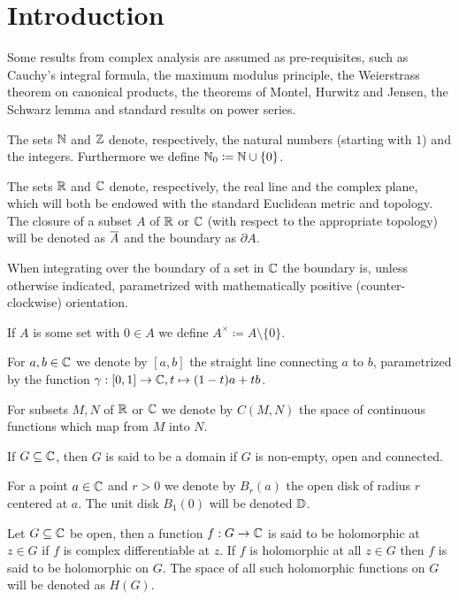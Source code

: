 \chapter{Introduction}
\label{ch:introduction}




Some results from complex analysis are assumed as pre-requisites, such as Cauchy's integral formula, the maximum modulus principle, the Weierstrass theorem on canonical products, the theorems of Montel, Hurwitz and Jensen, the Schwarz lemma and standard results on power series.

The sets $\mathbb{N}$ and $\mathbb{Z}$ denote, respectively, the natural numbers (starting with $1$) and the integers. Furthermore we define $\mathbb{N}_0 \coloneqq \mathbb{N} \cup \{ 0 \}$.

The sets $\mathbb{R}$ and $\mathbb{C}$ denote, respectively, the real line and the complex plane, which will both be endowed with the standard Euclidean metric and topology. The closure of a subset $A$ of $\mathbb{R}$ or $\mathbb{C}$ (with respect to the appropriate topology) will be denoted as $\overline{A}$ and the boundary as $\partial A$.

When integrating over the boundary of a set in $\mathbb{C}$ the boundary is, unless otherwise indicated, parametrized with mathematically positive (counter-clockwise) orientation.

If $A$ is some set with $0 \in A$ we define $A^\times \coloneqq A \setminus \{ 0 \}$.

For $a, b \in \mathbb{C}$ we denote by $[a, b]$ the straight line connecting $a$ to $b$, parametrized by the function $\gamma : [0, 1] \to \mathbb{C}, t \mapsto (1-t)a + tb$.

For subsets $M, N$ of $\mathbb{R}$ or $\mathbb{C}$ we denote by $C(M, N)$ the space of continuous functions which map from $M$ into $N$.

If $G \subseteq \mathbb{C}$, then $G$ is said to be a domain if $G$ is non-empty, open and connected.

For a point $a \in \mathbb{C}$ and $r > 0$ we denote by $B_r(a)$ the open disk of radius $r$ centered at $a$. The unit disk $B_1(0)$ will be denoted $\mathbb{D}$.

Let $G \subseteq \mathbb{C}$ be open, then a function $f : G \to \mathbb{C}$ is said to be holomorphic at $z \in G$ if $f$ is complex differentiable at $z$. If $f$ is holomorphic at all $z \in G$ then $f$ is said to be holomorphic on $G$. The space of all such holomorphic functions on $G$ will be denoted as $H(G)$.

